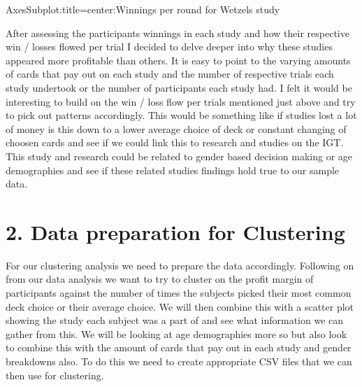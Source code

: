 \documentclass[letterpaper,10pt,english]{jupyterBook}
\begin{document}
\begin{sphinxVerbatim}[commandchars=\\\{\}]
 
\end{sphinxVerbatim}

\begin{sphinxVerbatim}[commandchars=\\\{\}]
\PYGZlt{}AxesSubplot:title=\PYGZob{}\PYGZsq{}center\PYGZsq{}:\PYGZsq{}Winnings per round for Wetzels study\PYGZsq{}\PYGZcb{}\PYGZgt{}
\end{sphinxVerbatim}

\noindent{}

\sphinxAtStartPar
After assessing the participants winnings in each study and how their respective win / losses flowed per trial I decided to delve deeper into why these studies appeared more profitable than others. It is easy to point to the varying amounts of cards that pay out on each study and the number of respective trials each study undertook or the number of participants each study had. I felt it would be interesting to build on the win / loss flow per trials mentioned just above and try to pick out patterns accordingly. This would be something like if studies lost a lot of money is this down to a lower average choice of deck or constant changing of choosen cards and see if we could link this to research and studies on the IGT. This study and research could be related to gender based decision making or age demographies and see if these related studies findings hold true to our sample data.


\chapter{2. Data preparation for Clustering}
\label{\detokenize{data-processing:data-preparation-for-clustering}}\label{\detokenize{data-processing::doc}}
\sphinxAtStartPar
For our clustering analysis we need to prepare the data accordingly. Following on from our data analysis we want to try to cluster on the profit margin of participants against the number of times the subjects picked their most common deck choice or their average choice. We will then combine this with a scatter plot showing the study each subject was a part of and see what information we can gather from this. We will be looking at age demographies more so but also look to combine this with the amount of cards that pay out in each study and gender breakdowns also. To do this we need to create appropriate CSV files that we can then use for clustering.
\end{document}
